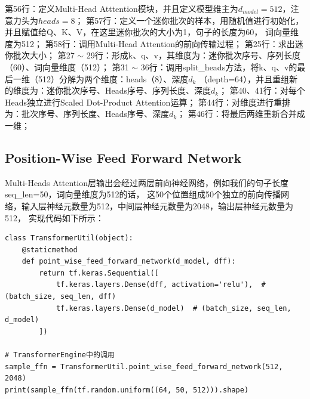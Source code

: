 \documentclass{article}
\begin{document}
第56行：定义Multi-Head Atttention模块，并且定义模型维主为$d_{model}=512$，注意力头为$heads=8$；\newline
第57行：定义一个迷你批次的样本，用随机值进行初始化，并且赋值给Q、K、V，在这里迷你批次的大小为1，句子的长度为60，
词向量维度为512；\newline
第58行：调用Multi-Head Attention的前向传输过程；\newline
第25行：求出迷你批次大小；\newline
第27 $\sim$ 29行：形成k、q、v，其维度为：迷你批次序号、序列长度（60）、词向量维度（512）；\newline
第31 $\sim$ 36行：调用split\_heads方法，将k、q、v的最后一维（512）分解为两个维度：heads（8）、深度$d_{k}$
（depth=64），并且重组新的维度为：迷你批次序号、Heads序号、序列长度、深度$d_{k}$；\newline
第40、41行：对每个Heads独立进行Scaled Dot-Product Attention运算；\newline
第44行：对维度进行重排为：批次序号、序列长度、Heads序号、深度$d_{k}$；\newline
第46行：将最后两维重新合并成一维；\newline

\subsection{Position-Wise Feed Forward Network}
Multi-Heads Attention层输出会经过两层前向神经网络，例如我们的句子长度seq\_len=50，词向量维度为512的话，
这50个位置组成50个独立的前向传播网络，输入层神经元数量为512，中间层神经元数量为2048，输出层神经元数量为512，
实现代码如下所示：
\begin{lstlisting}
class TransformerUtil(object):
    @staticmethod
    def point_wise_feed_forward_network(d_model, dff):
        return tf.keras.Sequential([
            tf.keras.layers.Dense(dff, activation='relu'),  # (batch_size, seq_len, dff)
            tf.keras.layers.Dense(d_model)  # (batch_size, seq_len, d_model)
        ])

# TransformerEngine中的调用
sample_ffn = TransformerUtil.point_wise_feed_forward_network(512, 2048)
print(sample_ffn(tf.random.uniform((64, 50, 512))).shape)
\end{lstlisting}
\end{document}
